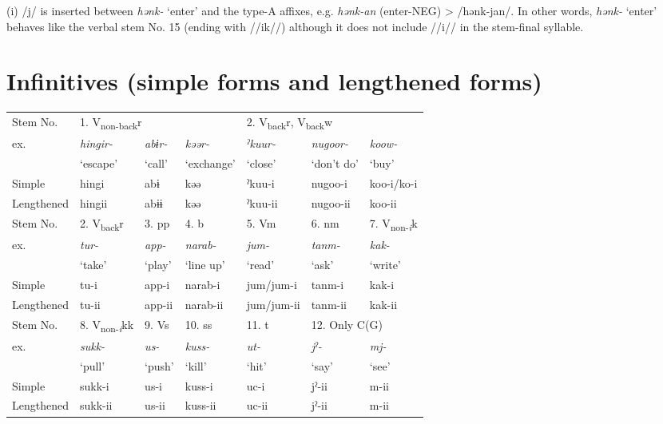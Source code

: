 (i)  /j/ is inserted between \textit{hənk-} ‘enter’ and the type-A affixes, e.g. \textit{hənk-an} (enter-NEG) > /hənk-jan/. In other words, \textit{hənk-} ‘enter’ behaves like the verbal stem No. 15 (ending with //ik//) although it does not include //i// in the stem-final syllable.

\section{Infinitives (simple forms and lengthened forms)}
 {\footnotesize
\begin{longtable}{ *{7}{l} }
\lsptoprule\endfirsthead\midrule\endhead\endfoot\lspbottomrule\endlastfoot
Stem No.   & \multicolumn{3}{l}{1. V\textsubscript{non-back}r} & \multicolumn{3}{l}{2. V\textsubscript{back}r, V\textsubscript{back}w}\\
ex.        & \textit{hingir-} & \textit{abɨr-} & \textit{kəər-} & \textit{ˀkuur-} & \textit{nugoor-} & \textit{koow-}\\
           & ‘escape’         & ‘call’         & ‘exchange’     & ‘close’         & ‘don’t do’       &  ‘buy’\\
Simple     &  hingi           & abɨ            &  kəə           & ˀkuu-i          & nugoo-i          &  koo-i\slash ko-i\\
Lengthened &  hingii          & abɨɨ           &  kəə           & ˀkuu-ii         & nugoo-ii         &  koo-ii\\
\midrule
Stem No.   & 2. V\textsubscript{back}r & 3. pp         & 4. b            & 5. Vm            & 6. nm          & 7. V\textsubscript{non-\textit{i}}k\\
ex.        & \textit{tur-}             & \textit{app-} & \textit{narab-} & \textit{jum-}    & \textit{tanm-} & \textit{kak-}\\
           & ‘take’                    & ‘play’        & ‘line up’       & ‘read’           & ‘ask’          & ‘write’\\
Simple     & tu-i                      & app-i         & narab-i         & jum\slash jum-i  & tanm-i         &  kak-i\\
Lengthened & tu-ii                     & app-ii        & narab-ii        & jum\slash jum-ii & tanm-ii        & kak-ii\\
\midrule

Stem No.   & 8. V\textsubscript{non-\textit{i}}kk & 9. Vs        & 10. ss         & 11. t        & \multicolumn{2}{l}{12. Only C(G)}\\
ex.        & \textit{sukk-}                       & \textit{us-} & \textit{kuss-} & \textit{ut-} & \textit{jˀ-} & \textit{mj-}\\
           & ‘pull’                               & ‘push’       & ‘kill’         & ‘hit’        & ‘say’        & ‘see’\\
Simple     & sukk-i                               & us-i         & kuss-i         & uc-i         & jˀ-ii        & m-ii\\
Lengthened & sukk-ii                              & us-ii        & kuss-ii        & uc-ii        & jˀ-ii        & m-ii\\
\midrule


\end{longtable}}
